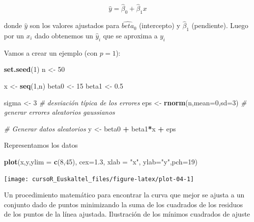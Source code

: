 \documentclass[]{book}
\newenvironment{Shaded}{\begin{snugshade}}{\end{snugshade}}
\newcommand{\KeywordTok}[1]{\textcolor[rgb]{0.13,0.29,0.53}{\textbf{#1}}}
\newcommand{\DataTypeTok}[1]{\textcolor[rgb]{0.13,0.29,0.53}{#1}}
\newcommand{\DecValTok}[1]{\textcolor[rgb]{0.00,0.00,0.81}{#1}}
\newcommand{\FloatTok}[1]{\textcolor[rgb]{0.00,0.00,0.81}{#1}}
\newcommand{\StringTok}[1]{\textcolor[rgb]{0.31,0.60,0.02}{#1}}
\newcommand{\CommentTok}[1]{\textcolor[rgb]{0.56,0.35,0.01}{\textit{#1}}}
\newcommand{\OperatorTok}[1]{\textcolor[rgb]{0.81,0.36,0.00}{\textbf{#1}}}
\newcommand{\NormalTok}[1]{#1}
\begin{document}
\[
         \hat{y} = \hat{\beta}_0 + \hat{\beta}_1 x
\]

donde \(\hat y\) son los valores ajustados para \(\hat{beta}_0\)
(intercepto) y \(\hat{\beta}_1\) (pendiente). Luego por un \(x_i\) dado
obtenemos un \(\hat{y}_i\) que se aproxima a \(y_i\)

Vamos a crear un ejemplo (con \(p=1\)):

\begin{Shaded}
\begin{Highlighting}[]
\KeywordTok{set.seed}\NormalTok{(}\DecValTok{1}\NormalTok{)}
\NormalTok{n <-}\StringTok{ }\DecValTok{50} 

\NormalTok{x <-}\StringTok{ }\KeywordTok{seq}\NormalTok{(}\DecValTok{1}\NormalTok{,n)}
\NormalTok{ beta0 <-}\StringTok{ }\DecValTok{15}
\NormalTok{ beta1 <-}\StringTok{ }\FloatTok{0.5}

\NormalTok{sigma <-}\StringTok{ }\DecValTok{3} \CommentTok{# desviación típica de los errores}
\NormalTok{eps <-}\StringTok{ }\KeywordTok{rnorm}\NormalTok{(n,}\DataTypeTok{mean=}\DecValTok{0}\NormalTok{,}\DataTypeTok{sd=}\DecValTok{3}\NormalTok{) }\CommentTok{# generar errores aleatorios gaussianos}

\CommentTok{# Generar datos aleatorios}
\NormalTok{ y <-}\StringTok{ }\NormalTok{beta0 }\OperatorTok{+}\StringTok{ }\NormalTok{beta1}\OperatorTok{*}\NormalTok{x  }\OperatorTok{+}\StringTok{  }\NormalTok{eps}
\end{Highlighting}
\end{Shaded}

Representamos los datos

\begin{Shaded}
\begin{Highlighting}[]
\KeywordTok{plot}\NormalTok{(x,y,}\DataTypeTok{ylim =} \KeywordTok{c}\NormalTok{(}\DecValTok{8}\NormalTok{,}\DecValTok{45}\NormalTok{), }\DataTypeTok{cex=}\FloatTok{1.3}\NormalTok{, }\DataTypeTok{xlab =} \StringTok{"x"}\NormalTok{, }\DataTypeTok{ylab=}\StringTok{"y"}\NormalTok{,}\DataTypeTok{pch=}\DecValTok{19}\NormalTok{)}
\end{Highlighting}
\end{Shaded}

\begin{center}\texttt{[image: cursoR\_Euskaltel\_files/figure-latex/plot-04-1]} \end{center}

Un procedimiento matemático para encontrar la curva que mejor se ajusta
a un conjunto dado de puntos minimizando la suma de los cuadrados de los
residuos de los puntos de la línea ajustada. Ilustración de los mínimos
cuadrados de ajuste
\end{document}
